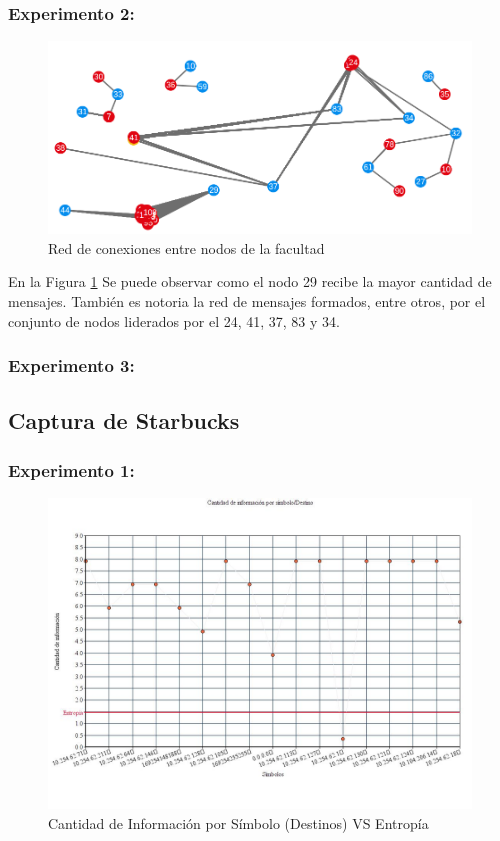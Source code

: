 \subsubsection{Experimento 2:}

\begin{figure}[H]
  \centering
    \includegraphics[scale=0.6]{imagenes/graficos/grafos/facultad.png}
  \caption{Red de conexiones entre nodos de la facultad}
  \label{fig:9}
\end{figure}

En la Figura \ref{fig:9} Se puede observar como el nodo 29 recibe la mayor cantidad de mensajes. También es notoria la red de mensajes formados, entre otros, por el conjunto de nodos liderados por el 24, 41, 37, 83 y 34.

\subsubsection{Experimento 3: }


\newpage
\subsection{Captura de Starbucks}

\subsubsection{Experimento 1:}


\begin{figure}[H]
  \centering
    \includegraphics[scale=0.45]{imagenes/graficos/entropiaCantInf/04destino.jpg}
  \caption{Cantidad de Información por Símbolo (Destinos) VS Entropía}
  \label{fig:10}
\end{figure}

